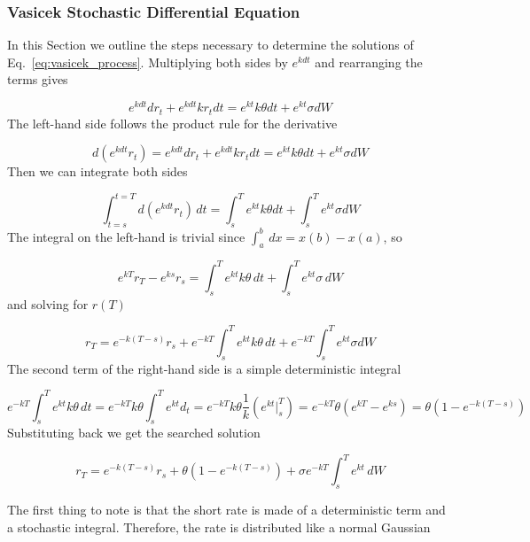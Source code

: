 \subsubsection{Vasicek Stochastic Differential Equation}
\label{vasicek-stochastic-differential-equation}

In this Section we outline the steps necessary to determine the solutions of Eq.~\ref{eq:vasicek_process}.
Multiplying both sides by \(e^{kdt}\) and rearranging the terms gives

\begin{equation*}
e^{kdt}dr_t + e^{kdt}kr_t dt = e^{kt}k\theta dt + e^{kt}\sigma dW
\end{equation*}
The left-hand side follows the product rule for the derivative

\begin{equation*}
d(e^{kdt}r_t) = e^{kdt}dr_t + e^{kdt}kr_t dt= e^{kt}k\theta dt + e^{kt}\sigma dW
\end{equation*}
Then we can integrate both sides

\begin{equation*}
\int^{t=T}_{t=s} d(e^{kdt}r_t)\,dt = \int^T_s e^{kt}k\theta dt +\int^T_s e^{kt}\sigma dW
\end{equation*}
The integral on the left-hand is trivial since \(\int^b_a\,dx = x(b)-x(a)\), so

\begin{equation*}
e^{kT}r_T - e^{ks}r_s = \int^T_s e^{kt}k\theta\,dt +\int^T_s e^{kt}\sigma\,dW
\end{equation*}
and solving for $r(T)$

\begin{equation*}
r_T=e^{-k(T-s)}r_s+ e^{-kT}\int^T_s e^{kt}k\theta\,dt +e^{-kT}\int^T_s e^{kt}\sigma dW
\end{equation*}
The second term of the right-hand side is a simple deterministic integral

\begin{equation*}
e^{-kT}\int^T_s e^{kt}k\theta\,dt=e^{-kT}k\theta\int^T_s e^{kt}d_t=e^{-kT}k\theta\frac{1}{k}(e^{kt}|^T_s)= e^{-kT}\theta(e^{kT}-e^{ks})=\theta\left(1-e^{-k(T-s)}\right)
\end{equation*}
Substituting back we get the searched solution

\begin{equation}
r_T=e^{-k(T-s)} r_s+\theta(1-e^{-k(T-s)})+ \sigma e^{-kT}\int^T_s e^{kt}\,dW
\end{equation}

The first thing to note is that the short rate is made of a deterministic term
and a stochastic integral.
Therefore, the rate is distributed like a normal Gaussian

